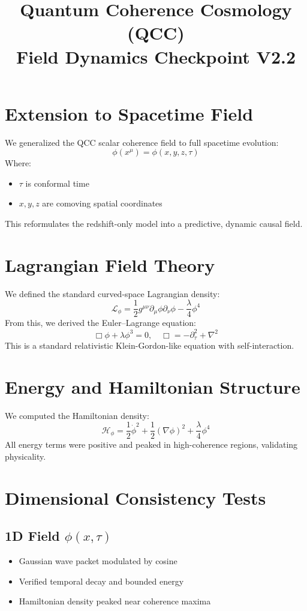 \documentclass{article}
\title{Quantum Coherence Cosmology (QCC)\\Field Dynamics Checkpoint V2.2}
\author{}
\date{}
\begin{document}
\maketitle

\section*{Extension to Spacetime Field}
We generalized the QCC scalar coherence field to full spacetime evolution:
\[
\phi(x^\mu) = \phi(x, y, z, \tau)
\]
Where:
\begin{itemize}
\item \( \tau \) is conformal time
\item \( x, y, z \) are comoving spatial coordinates
\end{itemize}
This reformulates the redshift-only model into a predictive, dynamic causal field.

\section*{Lagrangian Field Theory}
We defined the standard curved-space Lagrangian density:
\[
\mathcal{L}_\phi = \frac{1}{2} g^{\mu\nu} \partial_\mu \phi \partial_\nu \phi - \frac{\lambda}{4} \phi^4
\]
From this, we derived the Euler--Lagrange equation:
\[
\Box \phi + \lambda \phi^3 = 0, \quad \Box = -\partial_\tau^2 + \nabla^2
\]
This is a standard relativistic Klein-Gordon-like equation with self-interaction.

\section*{Energy and Hamiltonian Structure}
We computed the Hamiltonian density:
\[
\mathcal{H}_\phi = \frac{1}{2} \dot{\phi}^2 + \frac{1}{2} (\nabla \phi)^2 + \frac{\lambda}{4} \phi^4
\]
All energy terms were positive and peaked in high-coherence regions, validating physicality.

\section*{Dimensional Consistency Tests}

\subsection*{1D Field \( \phi(x, \tau) \)}
\begin{itemize}
\item Gaussian wave packet modulated by cosine
\item Verified temporal decay and bounded energy
\item Hamiltonian density peaked near coherence maxima
\end{itemize}
\end{document}
